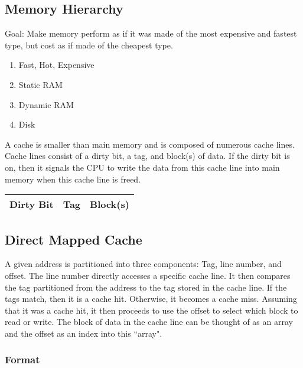 \documentclass[11pt]{article}
\begin{document}
\subsection{Memory Hierarchy}

Goal: Make memory perform as if it was made of the most expensive and fastest type, but cost as if made of the cheapest type.

\begin{enumerate}
	\item Fast, Hot, Expensive
	\item Static RAM
	\item Dynamic RAM
	\item Disk
\end{enumerate}

\noindent A cache is smaller than main memory and is composed of numerous cache lines. Cache lines consist of a dirty bit, a tag, and block(s) of data. If the dirty bit is on, then it signals the CPU to write the data from this cache line into main memory when this cache line is freed.

\begin{table}[H]
	\centering
	\begin{tabular}{| c | c | c |}
		\hline
		Dirty Bit	&	\hspace{.5cm} Tag \hspace{.5cm} 		&	\hspace{1cm} Block(s) \hspace{1cm} \\
		\hline
	\end{tabular}
\end{table}

\subsection{Direct Mapped Cache}

A given address is partitioned into three components: Tag, line number, and offset. The line number directly accesses a specific cache line. It then compares the tag partitioned from the address to the tag stored in the cache line. If the tags match, then it is a cache hit. Otherwise, it becomes a cache miss. Assuming that it was a cache hit, it then proceeds to use the offset to select which block to read or write. The block of data in the cache line can be thought of as an array and the offset as an index into this ``array".

\subsubsection{Format}
\end{document}
